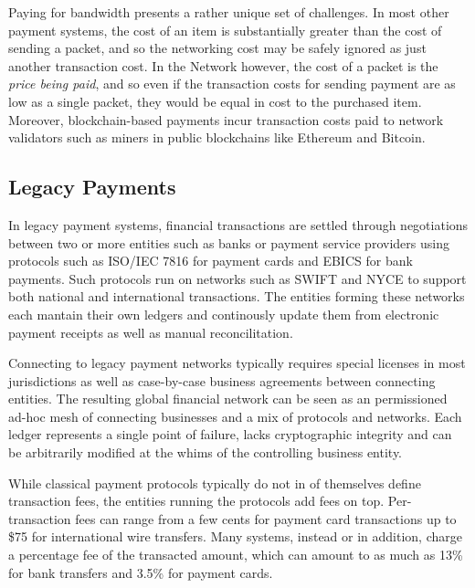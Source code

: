 
Paying for bandwidth presents a rather unique set of challenges. In most other payment systems, the cost of an item is substantially greater than the cost of sending a packet, and so the networking cost may be safely ignored as just another transaction cost. In the \Orchid{} Network however, the cost of a packet is the \emph{price being paid}, and so even if the transaction costs for sending payment are as low as a single packet, they would be equal in cost to the purchased item. Moreover, blockchain-based payments incur transaction costs paid to network validators such as miners in public blockchains like Ethereum and Bitcoin.

\subsection{Legacy Payments}

In legacy payment systems, financial transactions are settled through negotiations between two or more entities such as banks or payment service providers\cite{PSP} using protocols such as ISO/IEC 7816\cite{ISO7816} for payment cards and EBICS\cite{EBICS} for bank payments. Such protocols run on networks such as SWIFT\cite{SWIFT} and NYCE\cite{NYCE} to support both national and international transactions. The entities forming these networks each mantain their own ledgers and continously update them from electronic payment receipts as well as manual reconcilitation\cite{Reconcil}.

Connecting to legacy payment networks typically requires special licenses in most jurisdictions as well as case-by-case business agreements between connecting entities. The resulting global financial network can be seen as an permissioned ad-hoc mesh of connecting businesses and a mix of protocols and networks. Each ledger represents a single point of failure, lacks cryptographic integrity and can be arbitrarily modified at the whims of the controlling business entity.

While classical payment protocols typically do not in of themselves define transaction fees, the entities running the protocols add fees on top. Per-transaction fees can range from a few cents for payment card transactions\cite{CardFees1} up to \$75 for international wire transfers\cite{WireTransfers1}. Many systems, instead or in addition, charge a percentage fee of the transacted amount, which can amount to as much as 13\%\cite{WireTransfers2} for bank transfers and 3.5\% for payment cards\cite{CardFees2}.

